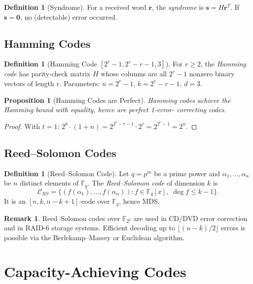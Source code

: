\documentclass[12pt,a4paper]{amsart}
\newtheorem{proposition}[theorem]{Proposition}
\theoremstyle{definition}
\newtheorem{definition}[theorem]{Definition}
\newtheorem{remark}[theorem]{Remark}
\theoremstyle{remark}
\begin{document}
\begin{definition}[Syndrome]
For a received word $\mathbf{r}$, the \emph{syndrome} is $\mathbf{s} = H
\mathbf{r}^T$. If $\mathbf{s} = \mathbf{0}$, no (detectable) error occurred.
\end{definition}

\subsection{Hamming Codes}

\begin{definition}[Hamming Code {$[2^r-1, 2^r-r-1, 3]$}]
For $r \geq 2$, the \emph{Hamming code} has parity-check matrix $H$ whose columns
are all $2^r - 1$ nonzero binary vectors of length $r$. Parameters:
$n = 2^r - 1$, $k = 2^r - r - 1$, $d = 3$.
\end{definition}

\begin{proposition}[Hamming Codes are Perfect]
Hamming codes achieve the Hamming bound with equality, hence are perfect 1-error-
correcting codes.
\end{proposition}
\begin{proof}
With $t=1$: $2^k \cdot (1 + n) = 2^{2^r-r-1} \cdot 2^r = 2^{2^r-1} = 2^n$.
\end{proof}

\subsection{Reed--Solomon Codes}

\begin{definition}[Reed--Solomon Code]
Let $q = p^m$ be a prime power and $\alpha_1,\ldots,\alpha_n$ be $n$ distinct
elements of $\mathbb{F}_q$. The \emph{Reed--Solomon code} of dimension $k$ is
\[
  \mathcal{C}_{RS} = \bigl\{(f(\alpha_1),\ldots,f(\alpha_n)) :
  f \in \mathbb{F}_q[x],\; \deg f \leq k-1\bigr\}.
\]
It is an $[n, k, n-k+1]$-code over $\mathbb{F}_q$, hence MDS.
\end{definition}

\begin{remark}
Reed--Solomon codes over $\mathbb{F}_{2^8}$ are used in CD/DVD error correction
and in RAID-6 storage systems. Efficient decoding up to $\lfloor(n-k)/2\rfloor$
errors is possible via the Berlekamp--Massey or Euclidean algorithm.
\end{remark}

\section{Capacity-Achieving Codes}
\end{document}
